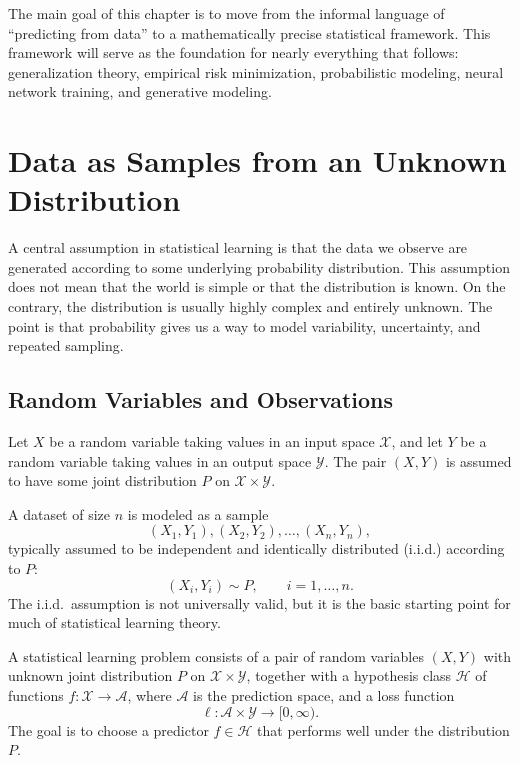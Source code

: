 The main goal of this chapter is to move from the informal language of ``predicting from data'' to a mathematically precise statistical framework. This framework will serve as the foundation for nearly everything that follows: generalization theory, empirical risk minimization, probabilistic modeling, neural network training, and generative modeling.

\section{Data as Samples from an Unknown Distribution}

A central assumption in statistical learning is that the data we observe are generated according to some underlying probability distribution. This assumption does not mean that the world is simple or that the distribution is known. On the contrary, the distribution is usually highly complex and entirely unknown. The point is that probability gives us a way to model variability, uncertainty, and repeated sampling.

\subsection{Random Variables and Observations}

Let $X$ be a random variable taking values in an input space $\mathcal{X}$, and let $Y$ be a random variable taking values in an output space $\mathcal{Y}$. The pair $(X,Y)$ is assumed to have some joint distribution $P$ on $\mathcal{X}\times\mathcal{Y}$.

A dataset of size $n$ is modeled as a sample
\[
(X_1,Y_1), (X_2,Y_2), \dots, (X_n,Y_n),
\]
typically assumed to be independent and identically distributed (i.i.d.) according to $P$:
\[
(X_i,Y_i) \sim P, \qquad i=1,\dots,n.
\]
The i.i.d.\ assumption is not universally valid, but it is the basic starting point for much of statistical learning theory.

\begin{definition}
A statistical learning problem consists of a pair of random variables $(X,Y)$ with unknown joint distribution $P$ on $\mathcal{X}\times\mathcal{Y}$, together with a hypothesis class $\mathcal{H}$ of functions $f:\mathcal{X}\to\mathcal{A}$, where $\mathcal{A}$ is the prediction space, and a loss function
\[
\ell:\mathcal{A}\times\mathcal{Y}\to[0,\infty).
\]
The goal is to choose a predictor $f\in\mathcal{H}$ that performs well under the distribution $P$.
\end{definition}

